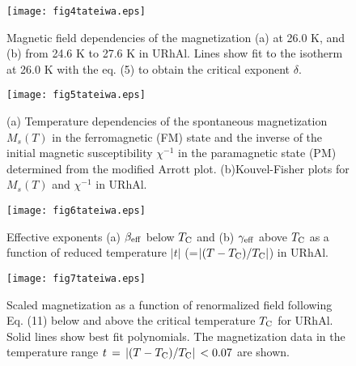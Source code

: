 \documentclass[twocolumn,showpacs,preprintnumbers,amsmath,amssymb]{revtex4}
\begin{document}
    \begin{figure}[]
\texttt{[image: fig4tateiwa.eps]}%
\caption{\label{fig:epsart}Magnetic field dependencies of the magnetization (a) at 26.0 K, and (b) from 24.6 K to 27.6 K in URhAl. Lines show fit to the isotherm at 26.0 K with the eq. (5) to obtain the critical exponent $\delta$.}
\end{figure} 
   \begin{figure}[]
\texttt{[image: fig5tateiwa.eps]}%
\caption{\label{fig:epsart}(a) Temperature dependencies of the spontaneous magnetization $M{_s}(T)$ in the ferromagnetic (FM) state and the inverse of the initial magnetic susceptibility ${\chi}^{-1}$ in the paramagnetic state (PM) determined from the modified Arrott plot. (b)Kouvel-Fisher plots for $M{_s}(T)$ and ${\chi}^{-1}$ in URhAl.}
\end{figure} 
        \begin{figure}[]
\texttt{[image: fig6tateiwa.eps]}%
\caption{\label{fig:epsart}Effective exponents (a) ${\beta}_{\rm eff}$ below $T_{\rm C}$ and (b) ${\gamma}_{\rm eff}$ above $T_{\rm C}$ as a function of reduced temperature $|t|$ (=$|({T}-{T_{\rm C}})/{T_{\rm C}}|$) in URhAl.}
\end{figure} 
    \begin{figure}[t]
\texttt{[image: fig7tateiwa.eps]}%
\caption{\label{fig:epsart}Scaled magnetization as a function of renormalized field following Eq. (11) below and above the critical temperature $T_{\rm C}$ 
for URhAl. Solid lines show best fit polynomials. The magnetization data in the temperature range $t{\,}={\,}|({T}-{T_{\rm C}})/{T_{\rm C}}|{\,}< 0.07$ are shown.}
\end{figure}
\end{document}
